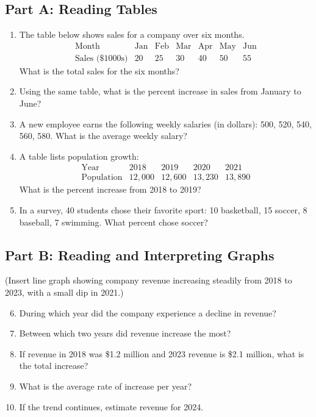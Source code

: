 \documentclass[12pt]{article}
\begin{document}
\subsection*{Part A: Reading Tables}
\begin{enumerate}
  \item The table below shows sales for a company over six months.  
  \[
  \begin{array}{c|cccccc}
  \text{Month} & \text{Jan} & \text{Feb} & \text{Mar} & \text{Apr} & \text{May} & \text{Jun}\\ \hline
  \text{Sales (\$1000s)} & 20 & 25 & 30 & 40 & 50 & 55
  \end{array}
  \]
  What is the total sales for the six months?

  \item Using the same table, what is the percent increase in sales from January to June?

  \item A new employee earns the following weekly salaries (in dollars): 500, 520, 540, 560, 580.  
  What is the average weekly salary?

  \item A table lists population growth:  
  \[
  \begin{array}{c|cccc}
  \text{Year} & 2018 & 2019 & 2020 & 2021\\ \hline
  \text{Population} & 12{,}000 & 12{,}600 & 13{,}230 & 13{,}890
  \end{array}
  \]
  What is the percent increase from 2018 to 2019?

  \item In a survey, 40 students chose their favorite sport: 10 basketball, 15 soccer, 8 baseball, 7 swimming.  
  What percent chose soccer?
\end{enumerate}

\subsection*{Part B: Reading and Interpreting Graphs}
(Insert line graph showing company revenue increasing steadily from 2018 to 2023, with a small dip in 2021.)

\begin{enumerate}
  \setcounter{enumi}{5}
  \item During which year did the company experience a decline in revenue?
  \item Between which two years did revenue increase the most?
  \item If revenue in 2018 was \$1.2 million and 2023 revenue is \$2.1 million, what is the total increase?
  \item What is the average rate of increase per year?
  \item If the trend continues, estimate revenue for 2024.
\end{enumerate}
\end{document}
